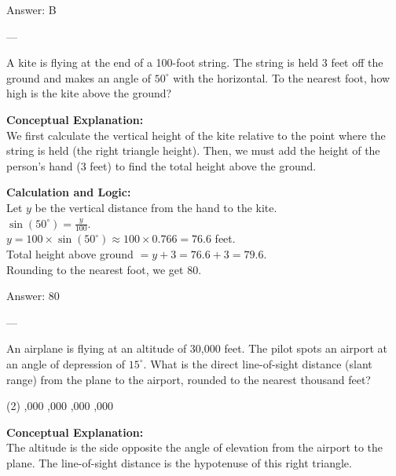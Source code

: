 \documentclass[11pt,paper=a4,answers]{exam}
\begin{document}
\begin{questions}
\begin{solution}
\vspace{15pt}
Answer: \colorbox{yellow!100}{B}
\end{solution}

---

\question
A kite is flying at the end of a 100-foot string. The string is held 3 feet off the ground and makes an angle of $50^\circ$ with the horizontal. To the nearest foot, how high is the kite above the ground?

\begin{solution}
\textbf{Conceptual Explanation:} \\
We first calculate the vertical height of the kite relative to the point where the string is held (the right triangle height). Then, we must add the height of the person's hand (3 feet) to find the total height above the ground.

\vspace{10pt}
\textbf{Calculation and Logic:} \\
Let $y$ be the vertical distance from the hand to the kite. \\
$\sin(50^\circ) = \frac{y}{100}$. \\
$y = 100 \times \sin(50^\circ) \approx 100 \times 0.766 = 76.6$ feet. \\
Total height above ground $= y + 3 = 76.6 + 3 = 79.6$. \\
Rounding to the nearest foot, we get 80.

\vspace{15pt}
Answer: \colorbox{yellow!100}{80}
\end{solution}

---

\question
An airplane is flying at an altitude of 30,000 feet. The pilot spots an airport at an angle of depression of $15^\circ$. What is the direct line-of-sight distance (slant range) from the plane to the airport, rounded to the nearest thousand feet?
\begin{tasks}(2)
    ,000
    ,000
    ,000
    ,000
\end{tasks}

\begin{solution}
\textbf{Conceptual Explanation:} \\
The altitude is the side opposite the angle of elevation from the airport to the plane. The line-of-sight distance is the hypotenuse of this right triangle.


\end{solution}
\end{questions}
\end{document}
